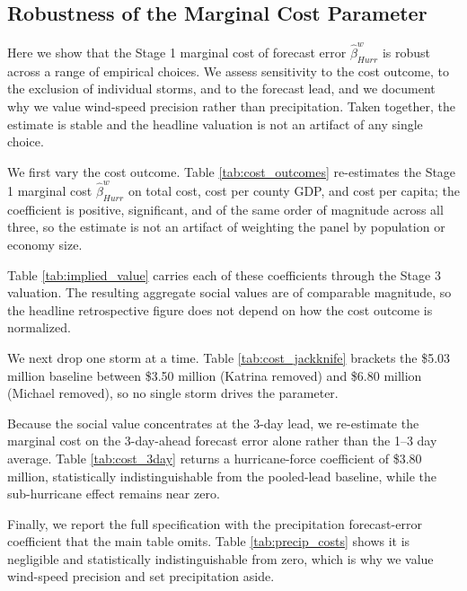 \documentclass[12pt]{article}%
\begin{document}
\begin{appendices}

\section{Robustness of the Marginal Cost Parameter} \label{app:beta}

Here we show that the Stage 1 marginal cost of forecast error $\hat{\beta}^w_{Hurr}$ is robust across a range of empirical choices. We assess sensitivity to the cost outcome, to the exclusion of individual storms, and to the forecast lead, and we document why we value wind-speed precision rather than precipitation. Taken together, the estimate is stable and the headline valuation is not an artifact of any single choice.

We first vary the cost outcome. Table \ref{tab:cost_outcomes} re-estimates the Stage 1 marginal cost $\hat{\beta}^w_{Hurr}$ on total cost, cost per county GDP, and cost per capita; the coefficient is positive, significant, and of the same order of magnitude across all three, so the estimate is not an artifact of weighting the panel by population or economy size.

Table \ref{tab:implied_value} carries each of these coefficients through the Stage 3 valuation. The resulting aggregate social values are of comparable magnitude, so the headline retrospective figure does not depend on how the cost outcome is normalized.

We next drop one storm at a time. Table \ref{tab:cost_jackknife} brackets the \$5.03 million baseline between \$3.50 million (Katrina removed) and \$6.80 million (Michael removed), so no single storm drives the parameter.

Because the social value concentrates at the 3-day lead, we re-estimate the marginal cost on the 3-day-ahead forecast error alone rather than the 1--3 day average. Table \ref{tab:cost_3day} returns a hurricane-force coefficient of \$3.80 million, statistically indistinguishable from the pooled-lead baseline, while the sub-hurricane effect remains near zero.

Finally, we report the full specification with the precipitation forecast-error coefficient that the main table omits. Table \ref{tab:precip_costs} shows it is negligible and statistically indistinguishable from zero, which is why we value wind-speed precision and set precipitation aside.


\end{appendices}
\end{document}
